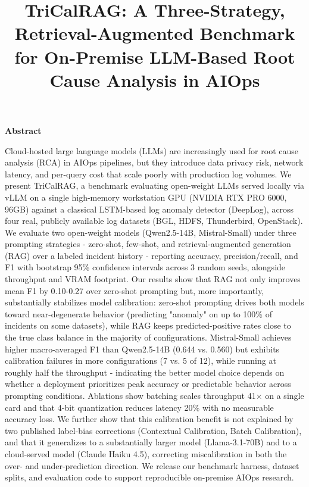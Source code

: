 \documentclass[10pt,conference]{IEEEtran}
\begin{document}
\title{TriCalRAG: A Three-Strategy, Retrieval-Augmented Benchmark for On-Premise LLM-Based Root Cause Analysis in AIOps}

\author{
}

\maketitle

\begin{center}
\textbf{Abstract}
\end{center}

Cloud-hosted large language models (LLMs) are increasingly used for root
cause analysis (RCA) in AIOps pipelines, but they introduce data privacy
risk, network latency, and per-query cost that scale poorly with production
log volumes. We present TriCalRAG, a benchmark evaluating open-weight
LLMs served locally via vLLM on a single high-memory workstation GPU
(NVIDIA RTX PRO 6000, 96GB) against a classical LSTM-based log anomaly
detector (DeepLog), across four real, publicly available log datasets
(BGL, HDFS, Thunderbird, OpenStack). We evaluate two open-weight models
(Qwen2.5-14B, Mistral-Small) under three prompting strategies - zero-shot,
few-shot, and retrieval-augmented generation (RAG) over a labeled incident
history - reporting accuracy, precision/recall, and F1 with bootstrap 95\%
confidence intervals across 3 random seeds, alongside throughput and VRAM
footprint. Our results show that RAG not only improves mean F1 by 0.10-0.27
over zero-shot prompting but, more importantly, substantially stabilizes
model calibration: zero-shot prompting drives both models toward
near-degenerate behavior (predicting "anomaly" on up to 100\% of incidents
on some datasets), while RAG keeps predicted-positive rates close to the
true class balance in the majority of configurations. Mistral-Small
achieves higher macro-averaged F1 than Qwen2.5-14B (0.644 vs. 0.560) but
exhibits calibration failures in more configurations (7 vs. 5 of 12), while
running at roughly half the throughput - indicating the better model choice
depends on whether a deployment prioritizes peak accuracy or predictable
behavior across prompting conditions. Ablations show batching scales
throughput 41$\times$ on a single card and that 4-bit quantization reduces
latency 20\% with no measurable accuracy loss. We further show that this
calibration benefit is not explained by two published label-bias
corrections (Contextual Calibration, Batch Calibration), and that it
generalizes to a substantially larger model (Llama-3.1-70B) and to a
cloud-served model (Claude Haiku 4.5), correcting miscalibration in both
the over- and under-prediction direction. We release our benchmark
harness, dataset splits, and evaluation code to support reproducible
on-premise AIOps research.
\end{document}
